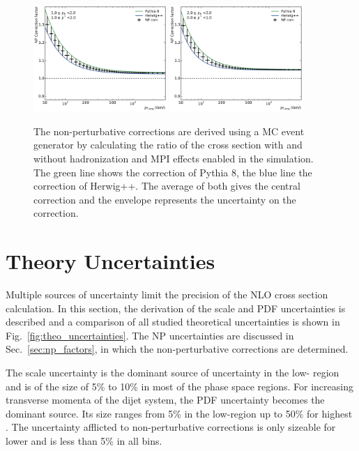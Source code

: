 \begin{figure}[htp]
    \includegraphics[width=0.45\textwidth]{figures/theory/np_factors_calc_yb1ys1.pdf}\hfill
    \includegraphics[width=0.45\textwidth]{figures/theory/np_factors_calc_yb2ys0.pdf}
    \caption[Non-perturbative Corrections]{The non-perturbative corrections are derived using a MC event
        generator by calculating the ratio of the cross section with and without
        hadronization and MPI effects enabled in the simulation. The green line
        shows the correction of Pythia 8, the blue line the correction of
    Herwig++. The average of both gives the central correction and the envelope
represents the uncertainty on the correction.}
    \label{fig:np_factors}
\end{figure}

\section{Theory Uncertainties}

Multiple sources of uncertainty limit the precision of the NLO cross section
calculation. In this section, the derivation of the scale and PDF
uncertainties is described and a comparison of all studied theoretical
uncertainties is shown in Fig.~\ref{fig:theo_uncertainties}. The NP
uncertainties are discussed in Sec.~\ref{sec:np_factors}, in which the
non-perturbative corrections are determined. 

The scale uncertainty is the dominant source of uncertainty in the low-\pt
region and is of the size of 5\% to 10\% in most of the phase space regions. For increasing
transverse momenta of the dijet system, the PDF uncertainty becomes the
dominant source. Its size ranges from 5\% in the low-\pt region up to
50\% for highest \pt. The uncertainty afflicted to non-perturbative corrections
is only sizeable for lower \pt and is less than 5\% in all bins.

